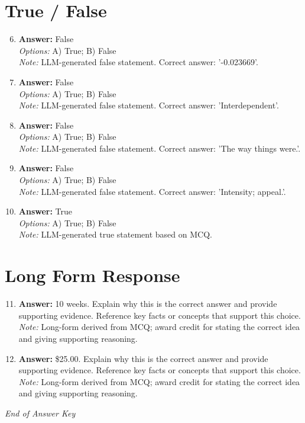 \documentclass[12pt]{article}
\begin{document}
\section*{True / False}
\begin{enumerate}[label=\arabic*.]
\setcounter{enumi}{5}
\item \textbf{Answer:} False
\\ \textit{Options:} A) True; B) False
\\ \textit{Note:} LLM-generated false statement. Correct answer: '-0.023669'.
\item \textbf{Answer:} False
\\ \textit{Options:} A) True; B) False
\\ \textit{Note:} LLM-generated false statement. Correct answer: 'Interdependent'.
\item \textbf{Answer:} False
\\ \textit{Options:} A) True; B) False
\\ \textit{Note:} LLM-generated false statement. Correct answer: 'The way things were.'.
\item \textbf{Answer:} False
\\ \textit{Options:} A) True; B) False
\\ \textit{Note:} LLM-generated false statement. Correct answer: 'Intensity; appeal.'.
\item \textbf{Answer:} True
\\ \textit{Options:} A) True; B) False
\\ \textit{Note:} LLM-generated true statement based on MCQ.
\end{enumerate}

\section*{Long Form Response}
\begin{enumerate}[label=\arabic*.]
\setcounter{enumi}{10}
\item \textbf{Answer:} 10 weeks. Explain why this is the correct answer and provide supporting evidence. Reference key facts or concepts that support this choice.
\\ \textit{Note:} Long-form derived from MCQ; award credit for stating the correct idea and giving supporting reasoning.
\item \textbf{Answer:} \$25.00. Explain why this is the correct answer and provide supporting evidence. Reference key facts or concepts that support this choice.
\\ \textit{Note:} Long-form derived from MCQ; award credit for stating the correct idea and giving supporting reasoning.
\end{enumerate}

\vfill
\noindent\textit{End of Answer Key}
\end{document}
